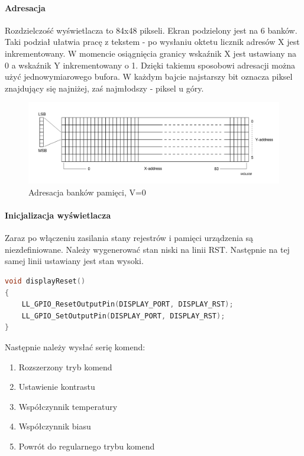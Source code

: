 \documentclass{article}
\begin{document}
\paragraph{Adresacja}
Rozdzielczość wyświetlacza to 84x48 pikseli. Ekran podzielony jest na 6 banków.
Taki podział ułatwia pracę z tekstem - po wysłaniu oktetu licznik adresów
X jest inkrementowany. W momencie osiągnięcia granicy wskaźnik X jest ustawiany na
0 a wskaźnik Y inkrementowany o 1. Dzięki takiemu sposobowi adresacji można użyć
jednowymiarowego bufora. W każdym bajcie najstarszy bit oznacza piksel znajdujący się najniżej,
zaś najmłodszy - piksel u góry.


\begin{figure}[ht]
    \includegraphics[scale=0.50]{address_display}
    \caption{Adresacja banków pamięci, V=0}
\end{figure}

\paragraph{Inicjalizacja wyświetlacza}
Zaraz po włączeniu zasilania stany rejestrów i pamięci urządzenia są niezdefiniowane.
Należy wygenerować stan niski na linii RST. Następnie na tej samej linii ustawiany
jest stan wysoki.

\begin{center}
\begin{lstlisting}[language=C, basicstyle=\footnotesize]
void displayReset()
{
    LL_GPIO_ResetOutputPin(DISPLAY_PORT, DISPLAY_RST);
    LL_GPIO_SetOutputPin(DISPLAY_PORT, DISPLAY_RST);
} 
\end{lstlisting}
\end{center}

Następnie należy wysłać serię komend:

\begin{enumerate}
    \item Rozszerzony tryb komend
    \item Ustawienie kontrastu
    \item Współczynnik temperatury
    \item Współczynnik biasu
    \item Powrót do regularnego trybu komend
\end{enumerate}
\end{document}
